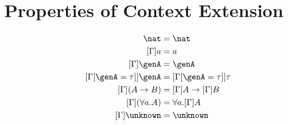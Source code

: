 
\section{Properties of Context Extension}

\begin{definition}
  \label{fig:ctxt:extension}
\end{definition}

\begin{definition}
  \begin{align*}
    [\Gamma]\nat & = \nat \\
    [\Gamma]a &= a \\
    [\Gamma]\genA &= \genA \\
    [\Gamma[\genA = \tau]]\genA &= [\Gamma[\genA = \tau]]\tau \\
    [\Gamma](A \to B) &= [\Gamma]A \to [\Gamma]B \\
    [\Gamma](\forall a. A) &= \forall a. [\Gamma]A \\
    [\Gamma]\unknown &= \unknown
  \end{align*}
\end{definition}

